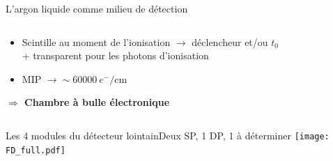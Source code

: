 \begin{frame}{L'argon liquide comme milieu de détection}
\begin{scriptsize}
\begin{columns}
\begin{column}{0.4\textwidth}
\begin{itemize}
           				\item Scintille au moment de l'ionisation $\rightarrow$ déclencheur et/ou $t_0$ \\ + transparent pour les photons  d'ionisation
         				\item MIP $\rightarrow\sim\SI{60000}{e^-\per\centi\meter}$
           			\end{itemize}
           			\begin{footnotesize}
       	    			\textbf{$\Rightarrow$ Chambre à bulle électronique}
       	    		\end{footnotesize}
           		\end{column}
           	\end{columns}
        \end{scriptsize}
    \end{frame}

    \begin{frame}{Les 4 modules du détecteur lointain}{Deux SP, 1 DP, 1 à déterminer}
        \texttt{[image: FD\_full.pdf]}
    \end{frame}
                
